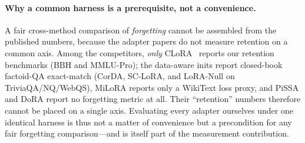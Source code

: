 \documentclass[11pt]{article}
\begin{document}
\paragraph{Why a common harness is a prerequisite, not a convenience.} A fair
cross-method comparison of \emph{forgetting} cannot be assembled from the published
numbers, because the adapter papers do not measure retention on a common axis.
Among the competitors, \emph{only} CLoRA~\citep{clora} reports our retention
benchmarks (BBH and MMLU-Pro); the data-aware inits report closed-book factoid-QA
exact-match (CorDA, SC-LoRA, and LoRA-Null on TriviaQA/NQ/WebQS), MiLoRA reports
only a WikiText loss proxy, and PiSSA and DoRA report no forgetting metric at all.
Their ``retention'' numbers therefore cannot be placed on a single axis. Evaluating
every adapter ourselves under one identical harness is thus not a matter of
convenience but a precondition for any fair forgetting comparison---and is itself
part of the measurement contribution.
\end{document}
